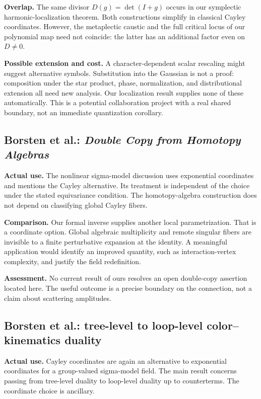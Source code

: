 \textbf{Overlap.} The same divisor $D(g)=\det(I+g)$ occurs in our symplectic harmonic-localization theorem. Both constructions simplify in classical Cayley coordinates. However, the metaplectic caustic and the full critical locus of our polynomial map need not coincide: the latter has an additional factor even on $D\ne0$.

\textbf{Possible extension and cost.} A character-dependent scalar rescaling might suggest alternative symbols. Substitution into the Gaussian is not a proof: composition under the star product, phase, normalization, and distributional extension all need new analysis. Our localization result supplies none of these automatically. This is a potential collaboration project with a real shared boundary, not an immediate quantization corollary.

\subsection{Borsten et al.: \emph{Double Copy from Homotopy Algebras}}

\textbf{Actual use.} The nonlinear sigma-model discussion uses exponential coordinates and mentions the Cayley alternative. Its treatment is independent of the choice under the stated equivariance condition. The homotopy-algebra construction does not depend on classifying global Cayley fibers.

\textbf{Comparison.} Our formal inverse supplies another local parametrization. That is a coordinate option. Global algebraic multiplicity and remote singular fibers are invisible to a finite perturbative expansion at the identity. A meaningful application would identify an improved quantity, such as interaction-vertex complexity, and justify the field redefinition.

\textbf{Assessment.} No current result of ours resolves an open double-copy assertion located here. The useful outcome is a precise boundary on the connection, not a claim about scattering amplitudes.

\subsection{Borsten et al.: tree-level to loop-level color--kinematics duality}

\textbf{Actual use.} Cayley coordinates are again an alternative to exponential coordinates for a group-valued sigma-model field. The main result concerns passing from tree-level duality to loop-level duality up to counterterms. The coordinate choice is ancillary.

